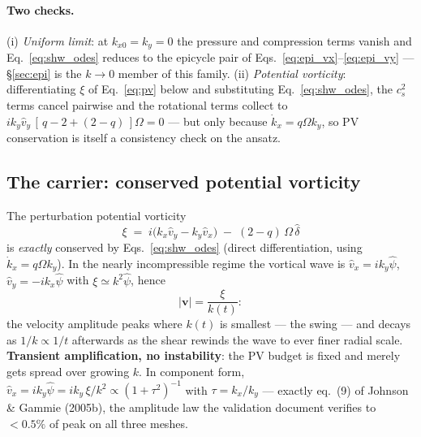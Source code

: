 \documentclass[11pt]{article}
\begin{document}
\paragraph{Two checks.} (i) \emph{Uniform limit}: at $k_{x0} = k_y = 0$ the
pressure and compression terms vanish and Eq.~\eqref{eq:shw_odes} reduces to the
epicycle pair of Eqs.~\eqref{eq:epi_vx}--\eqref{eq:epi_vy} --- \S\ref{sec:epi} is
the $k \to 0$ member of this
family. (ii) \emph{Potential vorticity}: differentiating $\xi$ of
Eq.~\eqref{eq:pv} below and substituting Eq.~\eqref{eq:shw_odes}, the $c_s^2$
terms cancel pairwise and the rotational terms collect to
$ik_y\hat v_y\,[\,q - 2 + (2{-}q)\,]\Omega = 0$ --- but only because
$\dot k_x = q\Omega k_y$, so PV conservation is itself a consistency check on the
ansatz.

\subsection{The carrier: conserved potential vorticity}
\label{sec:pv}
The perturbation potential vorticity
\begin{equation}
\xi \;=\; i\big(k_x\hat v_y - k_y\hat v_x\big) \;-\; (2-q)\,\Omega\,\hat\delta
\label{eq:pv}
\end{equation}
is \emph{exactly} conserved by Eqs.~\eqref{eq:shw_odes} (direct differentiation,
using $\dot k_x = q\Omega k_y$). In the nearly incompressible regime the vortical
wave is $\hat v_x = i k_y\hat\psi$, $\hat v_y = -i k_x\hat\psi$ with
$\xi \simeq k^2\hat\psi$, hence
\begin{equation}
|\mathbf v| = \frac{\xi}{k(t)} :
\end{equation}
the velocity amplitude peaks where $k(t)$ is smallest --- the swing --- and decays
as $1/k \propto 1/t$ afterwards as the shear rewinds the wave to ever finer radial
scale. \textbf{Transient amplification, no instability}: the PV budget is fixed
and merely gets spread over growing $k$. In component form,
$\hat v_x = ik_y\hat\psi = ik_y\,\xi/k^2 \propto (1+\tau^2)^{-1}$ with
$\tau = k_x/k_y$ --- exactly eq.~(9) of Johnson \& Gammie (2005b), the amplitude
law the validation document verifies to $<0.5\%$ of peak on all three meshes.
\end{document}
